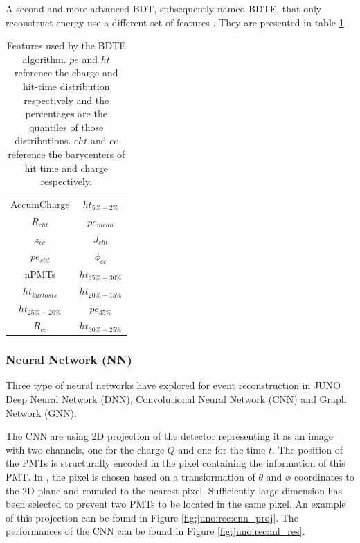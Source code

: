 \documentclass[../main.tex]{subfiles}
\begin{document}
A second and more advanced BDT, subsequently named BDTE, that only reconstruct energy use a different set of features \cite{gavrikov_energy_2022}. They are presented in table \ref{tab:juno:rec:bdte}

\begin{table}
  \centering
  \begin{tabular}{|c|c|}
    \hline
    AccumCharge &  $ht_{5\%-2\%}$ \\
    $R_{cht}$ & $pe_{mean}$ \\
    $z_{cc}$ & $J_{cht}$ \\
    $pe_{std}$ & $\phi_{cc}$ \\
    nPMTs &  $ht_{35\%-30\%}$\\
    $ht_{kurtosis}$ & $ht_{20\%-15\%}$ \\
    $ht_{25\%-20\%}$ & $pe_{35\%}$ \\
    $R_{cc}$ & $ht_{30\%-25\%}$ \\
    \hline

  \end{tabular}
  \caption{Features used by the BDTE algorithm. $pe$ and $ht$ reference the charge and hit-time distribution respectively and the percentages are the quantiles of those distributions. $cht$ and $cc$ reference the barycenters of hit time and charge respectively.}
  \label{tab:juno:rec:bdte}
\end{table}

\subsubsection{Neural Network (NN)}
Three type of neural networks have explored for event reconstruction in JUNO Deep Neural Network (DNN), Convolutional Neural Network (CNN) and Graph Network (GNN).

The CNN are using 2D projection of the detector representing it as an image with two channels, one for the charge $Q$ and one for the time $t$. The position of the PMTs is structurally encoded in the pixel containing the information of this PMT. In \cite{qian_vertex_2021}, the pixel is chosen based on a transformation of $\theta$ and $\phi$ coordinates to the 2D plane and rounded to the nearest pixel. Sufficiently large dimension has been selected to prevent two PMTs to be located in the same pixel. An example of this projection can be found in Figure \ref{fig:juno:rec:cnn_proj}. The performances of the CNN can be found in Figure \ref{fig:juno:rec:ml_res}.
\end{document}
